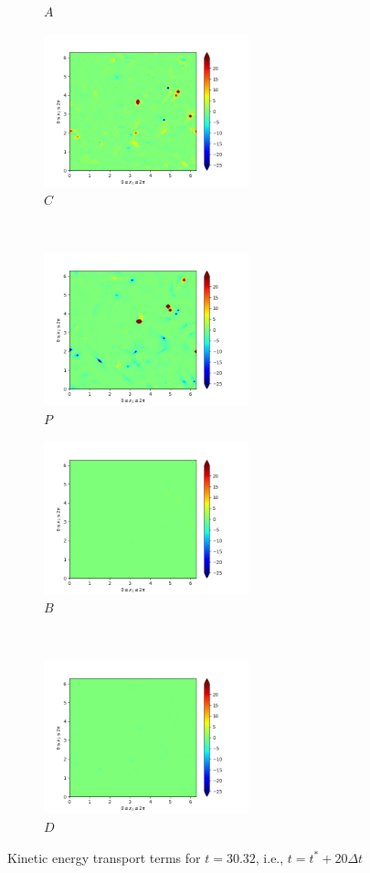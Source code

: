 \begin{figure}[H]
\begin{subfigure}{0.45\textwidth}
        \caption{$A$}
    \end{subfigure}
    \newline
    \begin{subfigure}{0.45\textwidth}
        \includegraphics[height=1.75in]{media/run-cds-65/C-ke-1360.png}
        \caption{$C$}
    \end{subfigure}
    ~
    \begin{subfigure}{0.45\textwidth}
        \includegraphics[height=1.75in]{media/run-cds-65/P-ke-1360.png}
        \caption{$P$}
    \end{subfigure}
    \newline
    \begin{subfigure}{0.45\textwidth}
        \includegraphics[height=1.75in]{media/run-cds-65/B-ke-1360.png}
        \caption{$B$}
    \end{subfigure}
    ~
    \begin{subfigure}{0.45\textwidth}
        \includegraphics[height=1.75in]{media/run-cds-65/D-ke-1360.png}
        \caption{$D$}
    \end{subfigure}
    \caption{Kinetic energy transport terms for $t=30.32$, i.e., $t=t^{\ast} + 20 \Delta t$}
\end{figure}

